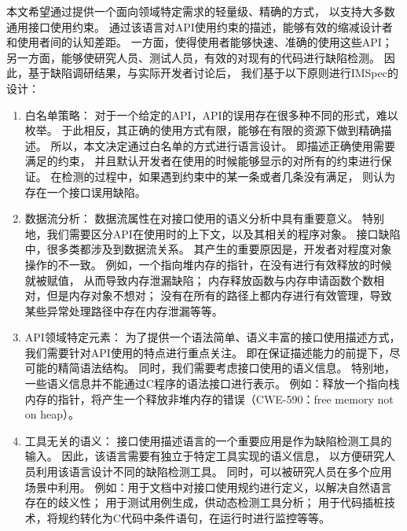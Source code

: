 本文希望通过提供一个面向领域特定需求的轻量级、精确的方式，
以支持大多数通用接口使用约束。
通过该语言对API使用约束的描述，能够有效的缩减设计者和使用者间的认知差距。
一方面，使得使用者能够快速、准确的使用这些API；
另一方面，能够使研究人员、测试人员，有效的对现有的代码进行缺陷检测。
因此，基于缺陷调研结果，与实际开发者讨论后，
我们基于以下原则进行IMSpec的设计：
\begin{enumerate}
	\item 白名单策略：
	对于一个给定的API，API的误用存在很多种不同的形式，难以枚举。
	于此相反，其正确的使用方式有限，能够在有限的资源下做到精确描述。
	所以，本文决定通过白名单的方式进行语言设计。
	即描述正确使用需要满足的约束，
	并且默认开发者在使用的时候能够显示的对所有的约束进行保证。
	在检测的过程中，如果遇到约束中的某一条或者几条没有满足，
	则认为存在一个接口误用缺陷。
	
	\item 数据流分析：
	数据流属性在对接口使用的语义分析中具有重要意义。
	特别地，我们需要区分API在使用时的上下文，以及其相关的程序对象。
	接口缺陷中，很多类都涉及到数据流关系。
	其产生的重要原因是，开发者对程度对象操作的不一致。
	例如，一个指向堆内存的指针，在没有进行有效释放的时候就被赋值，
	从而导致内存泄漏缺陷；
	内存释放函数与内存申请函数个数相对，但是内存对象不想对；
	没有在所有的路径上都内存进行有效管理，导致某些异常处理路径中存在内存泄漏等等。
	
	\item API领域特定元素：
	为了提供一个语法简单、语义丰富的接口使用描述方式，
	我们需要针对API使用的特点进行重点关注。
	即在保证描述能力的前提下，尽可能的精简语法结构。
	同时，我们需要考虑接口使用的语义信息。
	特别地，一些语义信息并不能通过C程序的语法接口进行表示。
	例如：释放一个指向栈内存的指针，将产生一个释放非堆内存的错误（CWE-590：free memory not on heap）。
	
	\item 工具无关的语义：
	接口使用描述语言的一个重要应用是作为缺陷检测工具的输入。
	因此，该语言需要有独立于特定工具实现的语义信息，
	以方便研究人员利用该语言设计不同的缺陷检测工具。
	同时，可以被研究人员在多个应用场景中利用。
	例如：用于文档中对接口使用规约进行定义，以解决自然语言存在的歧义性；
	用于测试用例生成，供动态检测工具分析；
	用于代码插桩技术，将规约转化为C代码中条件语句，在运行时进行监控等等。
\end{enumerate}


